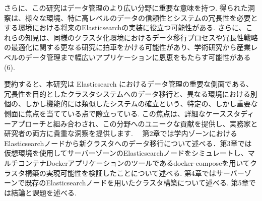 さらに、この研究はデータ管理のより広い分野に重要な意味を持つ. 得られた洞察は、様々な環境、特に高レベルのデータの信頼性とシステムの冗長性を必要とする環境における将来のElasticsearchの実装に役立つ可能性がある. さらに、これらの知見は、同様のクラスタ化環境におけるデータ移行プロセスや冗長性戦略の最適化に関する更なる研究に拍車をかける可能性があり、学術研究から産業レベルのデータ管理まで幅広いアプリケーションに恩恵をもたらす可能性がある(6). 

要約すると、本研究は Elasticsearch におけるデータ管理の重要な側面である、冗長性を目的としたクラスタシステムへのデータ移行と、異なる環境における別個の、しかし機能的には類似したシステムの確立という、特定の、しかし重要な側面に焦点を当てている点で際立っている. この焦点は、詳細なケーススタディーアプローチと組み合わされ、この分野へのユニークな貢献を提供し、実務家と研究者の両方に貴重な洞察を提供します. 
　第2章では学内ゾーンにおけるElasticsearchノードから新クラスタへのデータ移行について述べる．第3章では仮想環境を使用してサーバーゾーンのElasticsearchノードをシミュレートし、マルチコンテナDockerアプリケーションのツールであるdocker-composeを用いてクラスタ構築の実現可能性を検証したことについて述べる. 第4章ではサーバーゾーンで既存のElasticsearchノードを用いたクラスタ構築について述べる. 第5章では結論と課題を述べる. 